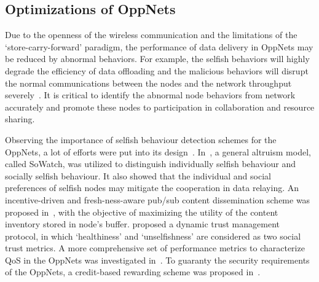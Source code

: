 \subsection{Optimizations of OppNets}
Due to the openness of
the wireless communication and the limitations of the
`store-carry-forward' paradigm,
the performance of data delivery in OppNets may be reduced
by abnormal behaviors.
For example,
the selfish behaviors will highly degrade
the efficiency of data offloading
and the malicious behaviors
will disrupt the
normal communications between the nodes and the network
throughput severely~\cite{DBLP:journals/comsur/JedariXN18}.
It is critical to
identify the abnormal node behaviors from
network accurately and promote these nodes to
participation in collaboration and resource sharing.

Observing the importance of selfish behaviour detection
schemes for the OppNets,
a lot of efforts were
put into its design~\cite{DBLP:journals/fgcs/JedariXCDTA19, Zhou2015Incentive, Chen2014Dynamic, DBLP:journals/tdsc/ChoC18, Wang2016A}.
In~\cite{DBLP:journals/fgcs/JedariXCDTA19},
a general altruism model,
called SoWatch,
was utilized to
distinguish individually selfish behaviour and socially selfish behaviour.
It also showed that the individual and social preferences of selfish nodes
may mitigate the cooperation in data relaying.
An incentive-driven and fresh-ness-aware pub/sub content dissemination scheme
was proposed in~\cite{Zhou2015Incentive},
with the objective of maximizing the utility of the content inventory stored in node's buffer.
\cite{Chen2014Dynamic} proposed a dynamic trust management protocol,
in which `healthiness' and
`unselfishness' are considered as two social trust metrics.
A more comprehensive set of performance metrics to characterize QoS in the OppNets
was investigated in~\cite{DBLP:journals/tdsc/ChoC18}.
To guaranty the security requirements of the OppNets,
a credit-based
rewarding scheme was proposed in~\cite{Wang2016A}.

